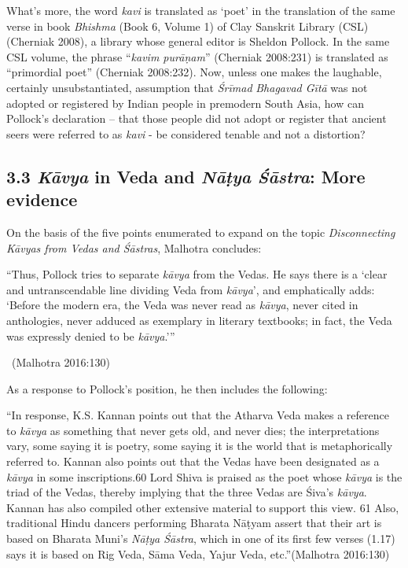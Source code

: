 What’s more, the word \textit{kavi} is translated as ‘poet’ in the translation of the same verse in book \textit{Bhishma} (Book 6, Volume 1) of Clay Sanskrit Library (CSL) (Cherniak 2008), a library whose general editor is Sheldon Pollock. In the same CSL volume, the phrase “\textit{kavim purāṇam}” (Cherniak 2008:231) is translated as “primordial poet” (Cherniak 2008:232). Now, unless one makes the laughable, certainly unsubstantiated, assumption that \textit{Śrīmad} \textit{Bhagavad Gītā} was not adopted or registered by Indian people in premodern South Asia, how can Pollock’s declaration – that those people did not adopt or register that ancient seers were referred to as \textit{kavi} - be considered tenable and not a distortion?


\subsection*{3.3 \textit{Kāvya} in Veda and \textit{Nāṭya Śāstra}: More evidence}

On the basis of the five points enumerated to expand on the topic \textit{Disconnecting Kāvyas from Vedas and Śāstras}, Malhotra concludes:

\begin{myquote}
 “Thus, Pollock tries to separate \textit{kāvya} from the Vedas. He says there is a ‘clear and untranscendable line dividing Veda from \textit{kāvya}’, and emphatically adds: ‘Before the modern era, the Veda was never read as \textit{kāvya}, never cited in anthologies, never adduced as exemplary in literary textbooks; in fact, the Veda was expressly denied to be \textit{kāvya}.’”

~\hfill (Malhotra 2016:130)
\end{myquote}

As a response to Pollock’s position, he then includes the following:

“In response, K.S. Kannan points out that the Atharva Veda makes a reference to \textit{kāvya} as something that never gets old, and never dies; the interpretations vary, some saying it is poetry, some saying it is the world that is metaphorically referred to. Kannan also points out that the Vedas have been designated as a \textit{kāvya} in some inscriptions.60 Lord Shiva is praised as the poet whose \textit{kāvya} is the triad of the Vedas, thereby implying that the three Vedas are Śiva’s \textit{kāvya}. Kannan has also compiled other extensive material to support this view. 61 Also, traditional Hindu dancers performing Bharata Nāṭyam assert that their art is based on Bharata Muni’s \textit{Nāṭya Śāstra}, which in one of its first few verses (1.17) says it is based on Rig Veda, Sāma Veda, Yajur Veda, etc.”\hfill (Malhotra 2016:130)

